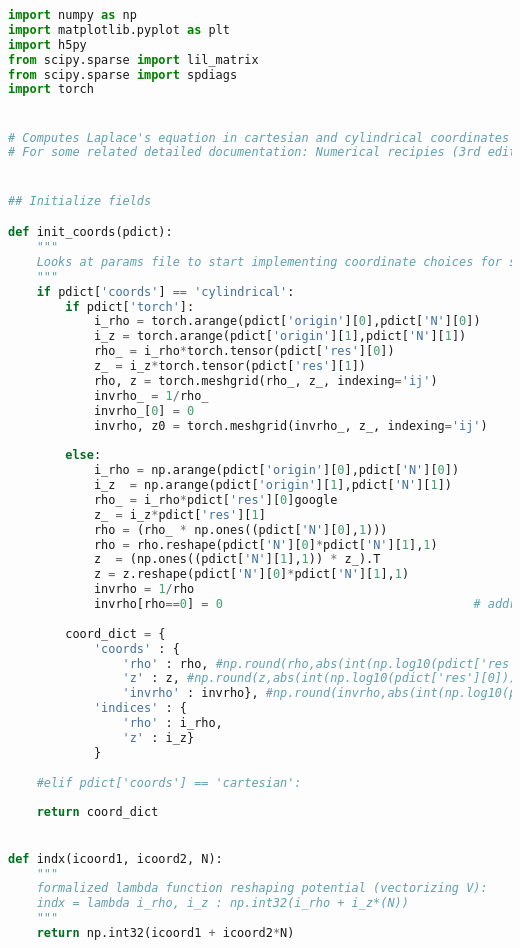 \begin{lstlisting}[frame=single, language=Python]
import numpy as np
import matplotlib.pyplot as plt
import h5py
from scipy.sparse import lil_matrix
from scipy.sparse import spdiags
import torch


# Computes Laplace's equation in cartesian and cylindrical coordinates
# For some related detailed documentation: Numerical recipies (3rd edition) (Chapter 20 [Partial Differential Equations])


## Initialize fields

def init_coords(pdict):
    """ 
    Looks at params file to start implementing coordinate choices for simulation
    """
    if pdict['coords'] == 'cylindrical':
        if pdict['torch']:
            i_rho = torch.arange(pdict['origin'][0],pdict['N'][0])
            i_z = torch.arange(pdict['origin'][1],pdict['N'][1])
            rho_ = i_rho*torch.tensor(pdict['res'][0])
            z_ = i_z*torch.tensor(pdict['res'][1])
            rho, z = torch.meshgrid(rho_, z_, indexing='ij')
            invrho_ = 1/rho_
            invrho_[0] = 0
            invrho, z0 = torch.meshgrid(invrho_, z_, indexing='ij')
            
        else:
            i_rho = np.arange(pdict['origin'][0],pdict['N'][0])
            i_z  = np.arange(pdict['origin'][1],pdict['N'][1])                                          
            rho_ = i_rho*pdict['res'][0]google
            z_ = i_z*pdict['res'][1]
            rho = (rho_ * np.ones((pdict['N'][0],1)))
            rho = rho.reshape(pdict['N'][0]*pdict['N'][1],1)
            z  = (np.ones((pdict['N'][1],1)) * z_).T
            z = z.reshape(pdict['N'][0]*pdict['N'][1],1)
            invrho = 1/rho
            invrho[rho==0] = 0                                   # addresses inf elements
            
        coord_dict = {
            'coords' : {
                'rho' : rho, #np.round(rho,abs(int(np.log10(pdict['res'][0])))),
                'z' : z, #np.round(z,abs(int(np.log10(pdict['res'][0])))),
                'invrho' : invrho}, #np.round(invrho,abs(int(np.log10(pdict['res'][0]))))},
            'indices' : {
                'rho' : i_rho,
                'z' : i_z}
            }
        
    #elif pdict['coords'] == 'cartesian': 
    
    return coord_dict
    

def indx(icoord1, icoord2, N):
    """
    formalized lambda function reshaping potential (vectorizing V):
    indx = lambda i_rho, i_z : np.int32(i_rho + i_z*(N))
    """
    return np.int32(icoord1 + icoord2*N)



\end{lstlisting}
